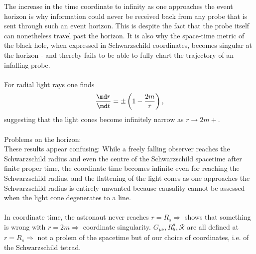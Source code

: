 The increase in the time coordinate to infinity as one approaches the event horizon is why information could never be received back from any probe that is sent through such an event horizon. This is despite the fact that the probe itself can nonetheless travel past the horizon. It is also why the space-time metric of the black hole, when expressed in Schwarzschild coordinates, becomes singular at the horizon - and thereby fails to be able to fully chart the trajectory of an infalling probe.
\\
\\ For radial light rays one finds 
\begin{equation}
	\frac{\md r}{\md t} = \pm \left(1-\frac{2m}{r}\right), 
\end{equation}
suggesting that the light cones become infinitely narrow as $r \rightarrow 2m +$.
\\
\\
Problems on the horizon:\\
These  results appear confusing: While a freely falling observer reaches the Schwarzschild radius and even the centre of the Schwarzschild spacetime after finite proper time, the coordinate time becomes infinite even for reaching the Schwarzschild radius, and the flattening of the light cones as one approaches the Schwarzschild radius is entirely unwanted because causality cannot be assessed when the light cone degenerates to a line.
\\
\\
In coordinate time, the astronaut never reaches $r=R_s \Rightarrow$ shows that something is wrong with $r=2m \Rightarrow$ coordinate singularity.
$G_{\mu \nu}, R^a_b, \mathcal{R}$ are all defined at $r=R_s \Rightarrow$ not a prolem of the spacetime but of our choice of coordinates, i.e. of the Schwarzschild tetrad.


